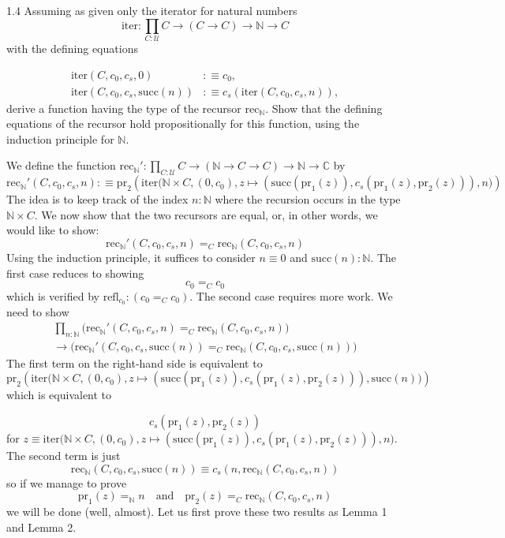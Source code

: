 \documentclass[14pt]{extarticle}
\newcommand{\N}{{\mathbb N}}
\newcommand{\C}{{\mathbb C}}
\newcommand{\0}{{\mathbf 0}}
\newcommand{\1}{{\mathbf 1}}
\newcommand{\2}{{\mathbf 2}}
\newcommand{\UU}{{\mathcal U}}
\newcommand{\mt}{\mapsto}
\newcommand{\rec}{\mathrm{rec}}
\newcommand{\su}{\mathrm{succ}}
\newcommand{\iter}{\mathrm{iter}}
\newcommand{\refl}{\mathrm{refl}}
\newcommand{\pr}{\mathrm{pr}}
\newcommand{\quadt}[1]{\quad \text{#1} \quad}
\begin{document}
\begin{prob}{1.4}{}
Assuming as given only the iterator for natural numbers \[\iter : \prod_{C:\UU} C \to (C \to C) \to \N \to C\] with the defining equations

\begin{align*}
\iter(C,c_0,c_s,0) &:\equiv c_0,\\
\iter(C,c_0,c_s,\su(n)) &:\equiv c_s(\iter(C,c_0,c_s,n)),
\end{align*}
derive a function having the type of the recursor $\rec_\N$. Show that the defining equations of the recursor hold propositionally for this function, using the induction principle for $\N$.
\end{prob}
We define the function $\rec_\N' : \prod_{C:\UU} C \to (\N \to C \to C) \to \N \to \C$ by
\[\rec_\N'(C, c_0, c_s,n) :\equiv \pr_2\left(\iter\Big(\N \times C, (0,c_0), z \mt (\su(\pr_1(z)) ,c_s(\pr_1(z), \pr_2(z))), n\Big)\right)\]
The idea is to keep track of the index $n : \N$ where the recursion occurs in the type $\N \times C$. We now show that the two recursors are equal, or, in other words, we would like to show:
\[\rec_\N'(C, c_0, c_s,n) =_C \rec_\N(C, c_0, c_s,n)\]
Using the induction principle, it suffices to consider $n \equiv 0$ and $\su(n) : \N$. The first case reduces to showing
\[c_0 =_C c_0\] which is verified by $\refl_{c_0} : (c_0 =_C c_0)$. The second case requires more work. We need to show 
\begin{multline*}
\prod_{n:\N}\Big(\rec_\N'(C, c_0, c_s,n) =_C \rec_\N(C, c_0, c_s,n)\Big) \\
\to \Big(\rec_\N'(C, c_0, c_s,\su(n)) =_C \rec_\N(C, c_0, c_s,\su(n))\Big)
\end{multline*}
The first term on the right-hand side is equivalent to
\[\pr_2\left(\iter\Big(\N \times C, (0,c_0), z \mt (\su(\pr_1(z)) ,c_s(\pr_1(z), \pr_2(z))), \su(n)\Big)\right)\] which is equivalent to 

\[c_s(\pr_1(z), \pr_2(z))\] for $z \equiv \iter\Big(\N \times C, (0,c_0), z \mt (\su(\pr_1(z)) ,c_s(\pr_1(z), \pr_2(z))), n\Big)$.\\
The second term is just
\[\rec_\N(C, c_0, c_s,\su(n)) \equiv c_s(n, \rec_\N(C, c_0, c_s,n))\]
so if we manage to prove
\[\pr_1(z) =_\N n \quadt{and} \pr_2(z) =_C \rec_\N(C, c_0, c_s,n)\] we will be done (well, almost). Let us first prove these two results as Lemma 1 and Lemma 2.
\end{document}
